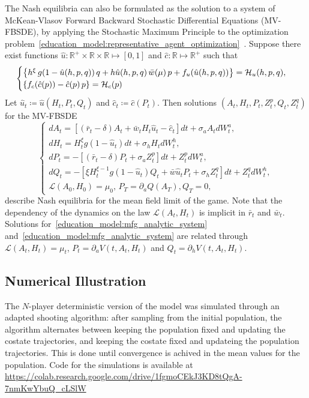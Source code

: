 The Nash equilibria can also be formulated as the solution to a system of 
McKean-Vlasov Forward Backward Stochastic Differential Equations (MV-FBSDE),
by applying the Stochastic Maximum Principle to the optimization problem~\eqref{education_model:representative_agent_optimization}~\cite{carmona2018probabilistic}.
Suppose there exist functions $\hat u : \mathbb{R}^+ \times \mathbb{R} \times \mathbb{R} \mapsto [0,1] $ and $\hat c : \mathbb{R} \mapsto \mathbb{R}^+$ such that
\begin{equation}
    \begin{cases}
         \left \{ h^\xi \, g(1 - {\hat u}(h,p,q))\, q + h {\hat u}(h,p,q) \, \bar w (\mu)\, p + f_u({\hat u}(h,p,q))\right\} = \mathcal{H}_u(h,p,q),\\
         \left \{  f_c({\hat c}(p)) - {\hat c}(p) \, p \right \} = \mathcal{H}_c(p)
    \end{cases}
\end{equation}
Let $\hat u_t \coloneqq \hat u(H_t,P_t,Q_t)$ and $\hat c_t \coloneqq \hat c(P_t)$.
Then solutions $(A_t, H_t, P_t, Z^p_t, Q_t, Z^q_t)$ for the MV-FBSDE
\begin{equation}\label{education_model:mfg_fbsde_system}
    \begin{cases}
        d A_t = \left[ (\bar r_t - \delta) A_t + \bar w_t H_t {\hat u}_t - {\hat c}_t  \right] dt + \sigma_a A_t d W^a_t,\\
        d H_t = H^\xi_t g(1 - {\hat u}_t) dt + \sigma_h H_t d W^h_t,\\
        d P_t = -\left[ (\bar r_t - \delta) P_t + \sigma_a Z^p_t \right]dt + Z^p_t d W^a_t,\\
        d Q_t = - \left[ \xi H_t^{\xi - 1} g(1 - {\hat u}_t ) Q_t + {\bar w} {\hat u}_t P_t + \sigma_h Z^q_t \right] dt + Z^q_t d W^h_t,\\
        \mathcal{L}(A_0, H_0) = \mu_0, \, P_T = \partial_a Q(A_T), Q_T = 0,
    \end{cases}
\end{equation}
describe Nash equilibria for the mean field limit of the game.
Note that the dependency of the dynamics on the law $\mathcal{L}(A_t,H_t)$ is implicit in $\bar r_t$ and $\bar w_t$.
Solutions for~\eqref{education_model:mfg_analytic_system} and~\eqref{education_model:mfg_analytic_system} are related through $\mathcal{L}(A_t, H_t) = \mu_t$, $P_t = \partial_a V(t,A_t,H_t)$ and $Q_t = \partial_h V(t,A_t,H_t)$.

\subsection{Numerical Illustration}
        The $N$-player deterministic version of the model was simulated through an adapted shooting algorithm: after sampling from the initial population, the algorithm alternates between keeping the population fixed and updating the costate trajectories, and keeping the costate fixed and updateing the population trajectories. This is done until convergence is achived in the mean values for the population. Code for the simulations is available at \url{https://colab.research.google.com/drive/1fgmoCEkJ3KD8tQgA-7nmKwYbuQ_cLSlW}
        
